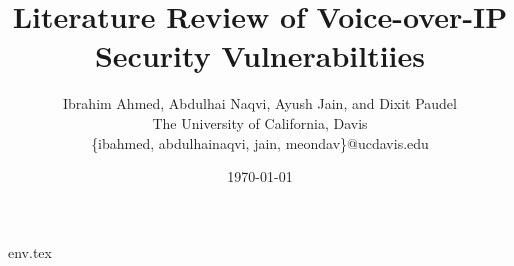 \documentclass[letterpaper,twocolumn,10pt]{article}
\begin{document}
\title{ Literature Review of Voice-over-IP Security Vulnerabiltiies}
  \date{ \today }
  \author{Ibrahim Ahmed, Abdulhai Naqvi, Ayush Jain, and Dixit Paudel\\
  The University of California, Davis\\
  \{ibahmed, abdulhainaqvi, jain, meondav\}@ucdavis.edu}

\maketitle



 {env.tex}




\appendix


\end{document}
